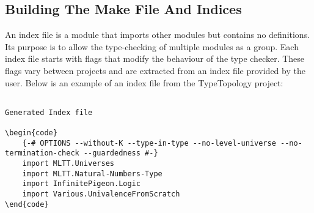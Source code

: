 
\subsection{Building The Make File And Indices} \label{sub:build_make_index}

An index file is a module that imports other modules but contains no
definitions. Its purpose is to allow the type-checking of multiple modules as a
group. Each index file starts with flags that modify the behaviour of the type
checker. These flags vary between projects and are extracted from an index file
provided by the user. Below is an example of an index file from the
TypeTopology project:

\begin{lstlisting}
    
Generated Index file

\begin{code}
    {-# OPTIONS --without-K --type-in-type --no-level-universe --no-termination-check --guardedness #-}
    import MLTT.Universes
    import MLTT.Natural-Numbers-Type
    import InfinitePigeon.Logic
    import Various.UnivalenceFromScratch
\end{code}
\end{lstlisting}

